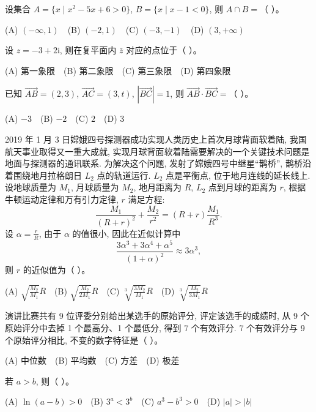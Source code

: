 \begin{question}
设集合 $A = \{x \mid x^2 - 5x + 6 > 0\}$, $B = \{x \mid x - 1 < 0\}$, 则 $A \cap B =$（ ）。

(A) $(-\infty, 1)$　(B) $(-2, 1)$　(C) $(-3, -1)$　(D) $(3, +\infty)$

\end{question}
\begin{question}
设 $z = -3 + 2\mathrm{i}$, 则在复平面内 $\bar{z}$ 对应的点位于（ ）。

(A) 第一象限　(B) 第二象限　(C) 第三象限　(D) 第四象限

\end{question}
\begin{question}
已知 $\vec{AB} = (2, 3)$, $\vec{AC} = (3, t)$, $|\vec{BC}| = 1$, 则 $\vec{AB} \cdot \vec{BC} =$（ ）。

(A) $-3$　(B) $-2$　(C) $2$　(D) $3$

\end{question}
\begin{question}
2019 年 1 月 3 日嫦娥四号探测器成功实现人类历史上首次月球背面软着陆, 我国航天事业取得又一重大成就, 实现月球背面软着陆需要解决的一个关键技术问题是地面与探测器的通讯联系. 为解决这个问题, 发射了嫦娥四号中继星“鹊桥”, 鹊桥沿着围绕地月拉格朗日 $L_2$ 点的轨道运行. $L_2$ 点是平衡点, 位于地月连线的延长线上. 设地球质量为 $M_1$, 月球质量为 $M_2$, 地月距离为 $R$, $L_2$ 点到月球的距离为 $r$, 根据牛顿运动定律和万有引力定律, $r$ 满足方程:
\nopagebreak[4]
\[
\frac{M_1}{(R+r)^2} + \frac{M_2}{r^2} = (R+r)\frac{M_1}{R^3}.
\]
设 $\alpha = \frac{r}{R}$, 由于 $\alpha$ 的值很小, 因此在近似计算中
\nopagebreak[4]
\[
\frac{3\alpha^3 + 3\alpha^4 + \alpha^5}{(1+\alpha)^2} \approx 3\alpha^3,
\]
则 $r$ 的近似值为（ ）。

(A) $\sqrt{\frac{M_2}{M_1}} R$　(B) $\sqrt{\frac{M_2}{2M_1}} R$　(C) $\sqrt[3]{\frac{3M_2}{M_1}} R$　(D) $\sqrt[3]{\frac{M_2}{3M_1}} R$

\end{question}
\begin{question}
演讲比赛共有 9 位评委分别给出某选手的原始评分, 评定该选手的成绩时, 从 9 个原始评分中去掉 1 个最高分、1 个最低分, 得到 7 个有效评分. 7 个有效评分与 9 个原始评分相比, 不变的数字特征是（ ）。

(A) 中位数　(B) 平均数　(C) 方差　(D) 极差

\end{question}
\begin{question}
若 $a > b$, 则（ ）。

(A) $\ln(a-b) > 0$　(B) $3^a < 3^b$　(C) $a^3 - b^3 > 0$　(D) $|a| > |b|$

\end{question}
